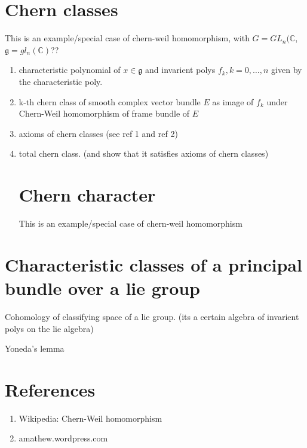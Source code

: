 \documentclass[a4paper]{article}
\theoremstyle{definition} \newtheorem*{definition}{Definition}
\theoremstyle{definition} \newtheorem*{definitions}{Definitions}
\theoremstyle{plain} \newtheorem{theorem}{Theorem}[section]
\theoremstyle{plain} \newtheorem{proposition}[theorem]{Proposition}
\theoremstyle{plain} \newtheorem{corollary}[theorem]{Corollary}
\theoremstyle{plain} \newtheorem{lemma}[theorem]{Lemma}
\theoremstyle{plain} \newtheorem{example}[theorem]{Example}
\begin{document}
\section{Chern classes}
This is an example/special case of chern-weil homomorphism,  with
$G=GL_n(\mathbb{C}$, $\mathfrak{g}=gl_n(\mathbb{C})$??
\begin{enumerate}
\item characteristic polynomial of $x\in \mathfrak{g}$ and invarient polys $f_k,  k=0, \ldots,  n$ given by the characteristic poly.
\item k-th chern class of smooth complex vector bundle $E$ as image of $f_k$ under Chern-Weil homomorphism of frame bundle of $E$
\item axioms of chern classes (see ref 1 and ref 2)
\item total chern class. (and show that it satisfies axioms of chern classes)

\section{Chern character}
This is an example/special case of chern-weil homomorphism

\end{enumerate}


\section{Characteristic classes of a principal bundle over a lie group}

Cohomology of classifying space of a lie group.  (its a certain algebra of invarient polys on the lie algebra)

Yoneda's lemma


\section*{References}
\begin{enumerate}
\item Wikipedia: Chern-Weil homomorphism
\item amathew.wordpress.com 
\end{enumerate}
\end{document}
